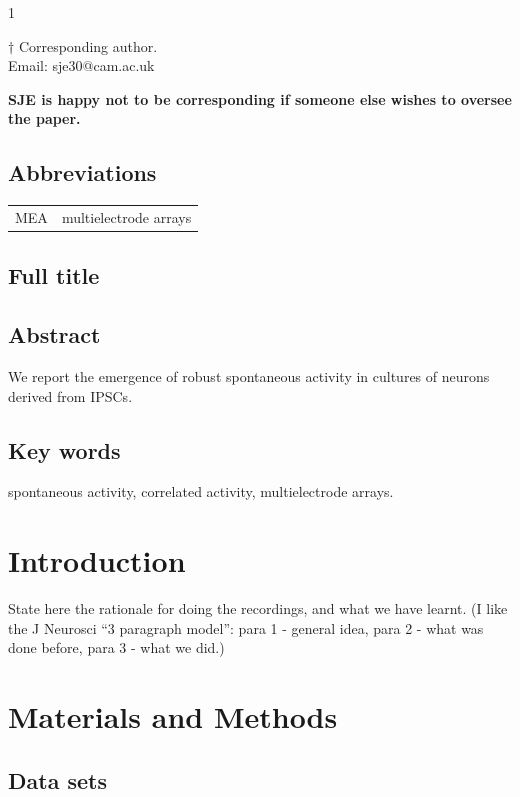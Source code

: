 1\documentclass[11pt]{article}
\begin{document}
\noindent $\dagger$
Corresponding author.\\
\noindent Email: sje30@cam.ac.uk  {\textbf{SJE is happy not to be
    corresponding if someone else wishes to oversee the paper.}

\vspace*{2cm}
\subsection*{Abbreviations}
\begin{tabular}{ll}
MEA & multielectrode arrays\\
\end{tabular}

\clearpage

\subsection*{Full title}

\thetitle


\subsection*{Abstract}

We report the emergence of robust spontaneous activity in cultures of
neurons derived from IPSCs.




\subsection*{Key words} spontaneous activity, correlated activity,
multielectrode arrays.


\clearpage
\section*{Introduction}


State here the rationale for doing the recordings, and what we have
learnt.  (I like the J Neurosci ``3 paragraph model'': para 1 -
general idea, para 2 - what was done before, para 3 - what we did.)
\section*{Materials and Methods}


\subsection*{Data sets}

}
\end{document}
